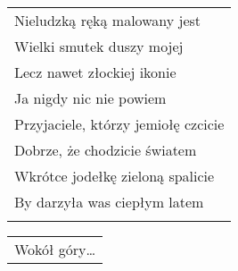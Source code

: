 \documentclass[a5paper]{article}
\begin{document}
\noindent
\begin{tabular}{@{}p{8.00cm}@{}}
Nieludzką ręką malowany jest \\
Wielki smutek duszy mojej \\
Lecz nawet złockiej ikonie \\
Ja nigdy nic nie powiem \\
Przyjaciele, którzy jemiołę czcicie \\
Dobrze, że chodzicie światem \\
Wkrótce jodełkę zieloną spalicie \\ 
By darzyła was ciepłym latem \\ \\
\end{tabular}

\noindent
\begin{tabular}{@{}p{7.00cm}@{}}
Wokół góry…
\end{tabular}
\end{document}
